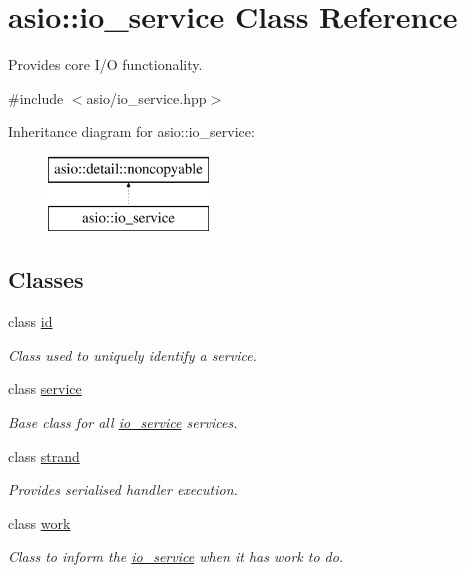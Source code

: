 \hypertarget{classasio_1_1io__service}{}\section{asio\+:\+:io\+\_\+service Class Reference}
\label{classasio_1_1io__service}


Provides core I/\+O functionality.  




{\ttfamily \#include $<$asio/io\+\_\+service.\+hpp$>$}

Inheritance diagram for asio\+:\+:io\+\_\+service\+:\begin{figure}[H]
\begin{center}
\leavevmode
\includegraphics[height=2.000000cm]{classasio_1_1io__service}
\end{center}
\end{figure}
\subsection*{Classes}
\begin{DoxyCompactItemize}
\item 
class \hyperlink{classasio_1_1io__service_1_1id}{id}
\begin{DoxyCompactList}\small\item\em Class used to uniquely identify a service. \end{DoxyCompactList}\item 
class \hyperlink{classasio_1_1io__service_1_1service}{service}
\begin{DoxyCompactList}\small\item\em Base class for all \hyperlink{classasio_1_1io__service}{io\+\_\+service} services. \end{DoxyCompactList}\item 
class \hyperlink{classasio_1_1io__service_1_1strand}{strand}
\begin{DoxyCompactList}\small\item\em Provides serialised handler execution. \end{DoxyCompactList}\item 
class \hyperlink{classasio_1_1io__service_1_1work}{work}
\begin{DoxyCompactList}\small\item\em Class to inform the \hyperlink{classasio_1_1io__service}{io\+\_\+service} when it has work to do. \end{DoxyCompactList}\end{DoxyCompactItemize}
